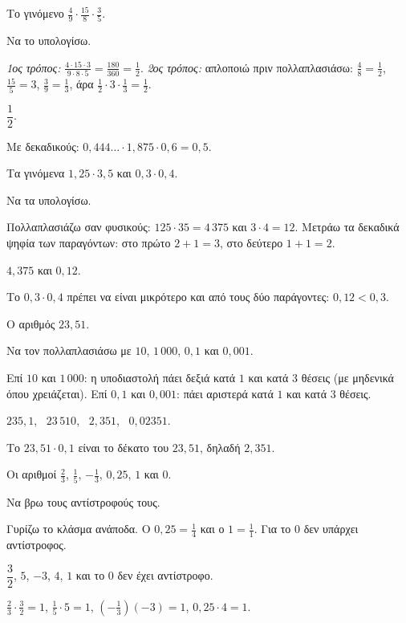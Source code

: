 \tixero Το γινόμενο $\frac{4}{9}\cdot\frac{15}{8}\cdot\frac{3}{5}$.\par
\tithelo Να το υπολογίσω.\par
\possindeo \emph{1ος τρόπος:} $\frac{4\cdot15\cdot3}{9\cdot8\cdot5}=\frac{180}{360}=\frac{1}{2}$. \emph{2ος τρόπος:} απλοποιώ πριν πολλαπλασιάσω: $\frac{4}{8}=\frac{1}{2}$, $\frac{15}{5}=3$, $\frac{3}{9}=\frac{1}{3}$, άρα $\frac{1}{2}\cdot3\cdot\frac{1}{3}=\frac{1}{2}$.\par
\apantisi $\dfrac{1}{2}$.\par
\elegxos Με δεκαδικούς: $0{,}444\ldots\cdot1{,}875\cdot0{,}6=0{,}5$.

\tixero Τα γινόμενα $1{,}25\cdot3{,}5$ και $0{,}3\cdot0{,}4$.\par
\tithelo Να τα υπολογίσω.\par
\possindeo Πολλαπλασιάζω σαν φυσικούς: $125\cdot35=4\,375$ και $3\cdot4=12$. Μετράω τα δεκαδικά ψηφία των παραγόντων: στο πρώτο $2+1=3$, στο δεύτερο $1+1=2$.\par
\apantisi $4{,}375$ και $0{,}12$.\par
\elegxos Το $0{,}3\cdot0{,}4$ πρέπει να είναι μικρότερο και από τους δύο παράγοντες: $0{,}12<0{,}3$.

\tixero Ο αριθμός $23{,}51$.\par
\tithelo Να τον πολλαπλασιάσω με $10$, $1\,000$, $0{,}1$ και $0{,}001$.\par
\possindeo Επί $10$ και $1\,000$: η υποδιαστολή πάει δεξιά κατά $1$ και κατά $3$ θέσεις (με μηδενικά όπου χρειάζεται). Επί $0{,}1$ και $0{,}001$: πάει αριστερά κατά $1$ και κατά $3$ θέσεις.\par
\apantisi $235{,}1$, \ $23\,510$, \ $2{,}351$, \ $0{,}02351$.\par
\elegxos Το $23{,}51\cdot0{,}1$ είναι το δέκατο του $23{,}51$, δηλαδή $2{,}351$.

\tixero Οι αριθμοί $\frac{2}{3}$, $\frac{1}{5}$, $-\frac{1}{3}$, $0{,}25$, $1$ και $0$.\par
\tithelo Να βρω τους αντίστροφούς τους.\par
\possindeo Γυρίζω το κλάσμα ανάποδα. Ο $0{,}25=\frac{1}{4}$ και ο $1=\frac{1}{1}$. Για το $0$ δεν υπάρχει αντίστροφος.\par
\apantisi $\dfrac{3}{2}$, $5$, $-3$, $4$, $1$ και το $0$ δεν έχει αντίστροφο.\par
\elegxos $\frac{2}{3}\cdot\frac{3}{2}=1$, $\frac{1}{5}\cdot5=1$, $\left(-\frac{1}{3}\right)(-3)=1$, $0{,}25\cdot4=1$.

